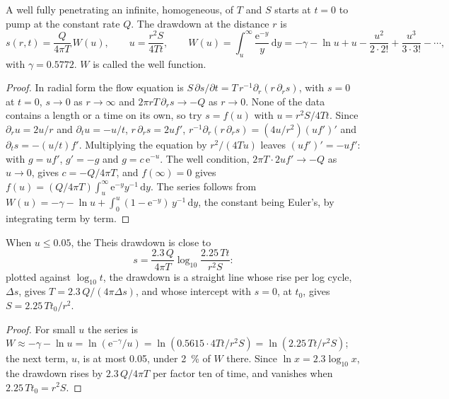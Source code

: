 \begin{theorem}\label{thm:b3:hydrogeology:theis}
A well fully penetrating an infinite, homogeneous,  of
 $T$ and  $S$ starts at $t = 0$ to pump at the
constant rate $Q$. The drawdown at the distance $r$ is
\[
s(r, t) = \frac{Q}{4\pi T}\,W(u), \qquad u = \frac{r^2S}{4Tt}, \qquad
W(u) = \int_u^\infty\frac{\mathrm e^{-y}}{y}\,\mathrm dy = -\gamma - \ln u +
u - \frac{u^2}{2\cdot2!} + \frac{u^3}{3\cdot3!} - \cdots,
\]
with $\gamma = \num{0.5772}$. $W$ is called the well function.
\end{theorem}

\begin{proof}
In radial form the flow equation is $S\,\partial s/\partial t =
T\,r^{-1}\partial_r(r\,\partial_rs)$, with $s = 0$ at $t = 0$, $s \to 0$ as
$r \to \infty$ and $2\pi rT\,\partial_rs \to -Q$ as $r \to 0$. None of the
data contains a length or a time on its own, so try $s = f(u)$ with $u =
r^2S/4Tt$. Since $\partial_ru = 2u/r$ and $\partial_tu = -u/t$, $r\,\partial_rs =
2uf'$, $r^{-1}\partial_r(r\,\partial_rs) = (4u/r^2)(uf')'$ and $\partial_ts =
-(u/t)f'$. Multiplying the equation by $r^2/(4Tu)$ leaves $(uf')' = -uf'$:
with $g = uf'$, $g' = -g$ and $g = c\,\mathrm e^{-u}$. The well condition, $2\pi T\cdot2uf' \to -Q$ as $u \to 0$, gives $c =
-Q/4\pi T$, and $f(\infty) = 0$ gives $f(u) = (Q/4\pi T)\int_u^\infty
\mathrm e^{-y}y^{-1}\,\mathrm dy$. The series follows from
$W(u) = -\gamma - \ln u + \int_0^u(1 - \mathrm e^{-y})\,y^{-1}\,\mathrm dy$,
the constant being Euler's, by integrating term by term.
\end{proof}

\begin{proposition}\label{prop:b3:hydrogeology:cooper-jacob}
When $u \le 0.05$, the Theis drawdown is close to
\[
s = \frac{2.3\,Q}{4\pi T}\log_{10}\frac{2.25\,Tt}{r^2S} :
\]
plotted against $\log_{10}t$, the drawdown is a straight line whose rise per
log cycle, $\Delta s$, gives $T = 2.3\,Q/(4\pi\Delta s)$, and whose
intercept with $s = 0$, at $t_0$, gives $S = 2.25\,Tt_0/r^2$.
\end{proposition}

\begin{proof}
For small $u$ the series is $W \approx -\gamma - \ln u = \ln(\mathrm
e^{-\gamma}/u) = \ln(0.5615\cdot4Tt/r^2S) = \ln(2.25\,Tt/r^2S)$; the next
term, $u$, is at most \num{0.05}, under \qty{2}{\percent} of $W$ there.
Since $\ln x = 2.3\log_{10}x$, the drawdown rises by $2.3\,Q/4\pi T$ per
factor ten of time, and vanishes when $2.25\,Tt_0 = r^2S$.
\end{proof}

